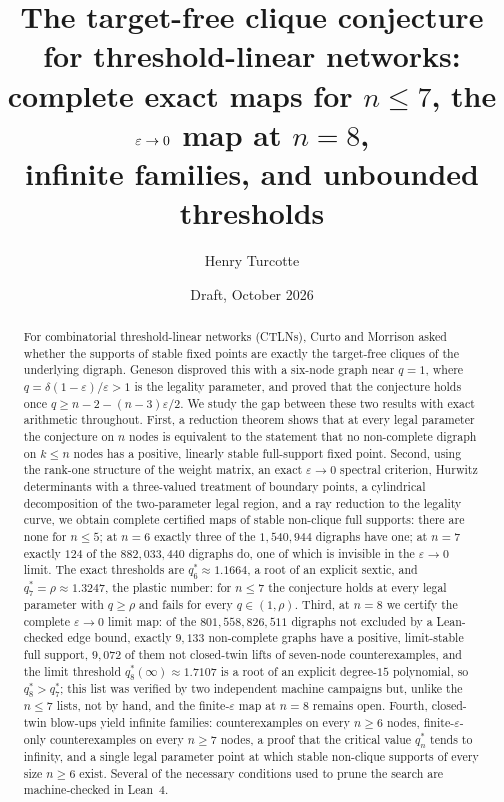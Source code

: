 \documentclass[11pt]{article}
\title{The target-free clique conjecture for threshold-linear networks:\\
complete exact maps for $n\le 7$, the $\eps\to0$ map at $n=8$,\\ infinite families, and unbounded thresholds}
\author{Henry Turcotte}
\date{Draft, October 2026}
\theoremstyle{definition}
\newcommand{\eps}{\varepsilon}
\begin{document}
\maketitle

\begin{abstract}
For combinatorial threshold-linear networks (CTLNs), Curto and Morrison asked whether the supports of
stable fixed points are exactly the target-free cliques of the underlying digraph. Geneson disproved this
with a six-node graph near $q=1$, where $q=\delta(1-\eps)/\eps>1$ is the legality parameter, and proved
that the conjecture holds once $q\ge n-2-(n-3)\eps/2$. We study the gap between these two results
with exact arithmetic throughout. First, a reduction theorem shows that at every legal parameter the
conjecture on $n$ nodes is equivalent to the statement that no non-complete digraph on $k\le n$ nodes
has a positive, linearly stable full-support fixed point. Second, using the rank-one structure of the
weight matrix, an exact $\eps\to0$ spectral criterion, Hurwitz determinants with a three-valued
treatment of boundary points, a cylindrical decomposition of the two-parameter legal region, and a
ray reduction to the legality curve, we obtain complete certified maps of stable non-clique full
supports: there are none for $n\le5$; at $n=6$ exactly three of the $1{,}540{,}944$ digraphs have one; at
$n=7$ exactly $124$ of the $882{,}033{,}440$ digraphs do, one of which is invisible in the $\eps\to0$ limit. The exact
thresholds are $q_6^*\approx1.1664$, a root of an explicit sextic, and $q_7^*=\rho\approx1.3247$, the
plastic number: for $n\le7$ the conjecture holds at every legal parameter with $q\ge\rho$ and fails for
every $q\in(1,\rho)$. Third, at $n=8$ we certify the complete $\eps\to0$ limit map: of the $801{,}558{,}826{,}511$
digraphs not excluded by a Lean-checked edge bound, exactly $9{,}133$ non-complete graphs have a positive, limit-stable
full support, $9{,}072$ of them not closed-twin lifts of seven-node counterexamples, and the limit threshold
$q_8^*(\infty)\approx1.7107$ is a root of an explicit degree-$15$ polynomial, so $q_8^*>q_7^*$; this list was verified by
two independent machine campaigns but, unlike the $n\le7$ lists, not by hand, and the finite-$\eps$ map at $n=8$ remains
open. Fourth, closed-twin blow-ups yield infinite families: counterexamples on every
$n\ge6$ nodes, finite-$\eps$-only counterexamples on every $n\ge7$ nodes, a proof that the critical
value $q_n^*$ tends to infinity, and a single legal parameter point at which stable non-clique supports
of every size $n\ge 6$ exist. Several of the necessary conditions used to prune the search are
machine-checked in Lean~4.
\end{abstract}
\end{document}
